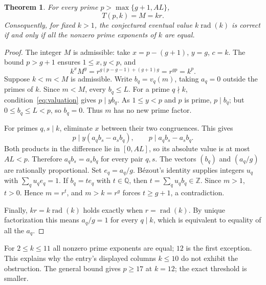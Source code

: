 \documentclass[11pt]{article}
\newtheorem{theorem}{Theorem}
\DeclareMathOperator{\rad}{rad}
\begin{document}
\begin{theorem}\label{thm:correction}
For every prime $p>\max\{g+1,AL\}$,
\[
 T(p,k)=M=k r.
\]
Consequently, for fixed $k>1$, the conjectured eventual value $k\rad(k)$
is correct if and only if all the nonzero prime exponents of $k$ are equal.
\end{theorem}
\begin{proof}
The integer $M$ is admissible: take $x=p-(g+1)$, $y=g$, $c=k$.
The bound $p>g+1$ ensures $1\le x,y<p$, and
\[
 k^x M^y=r^{g(p-g-1)+(g+1)g}=r^{gp}=k^p.
\]
Suppose $k<m<M$ is admissible. Write $b_q=v_q(m)$, taking $a_q=0$
outside the primes of $k$. Since $m<M$, every $b_q\le L$.
For a prime $q\nmid k$, condition~\eqref{eq:valuation} gives $p\mid yb_q$.
As $1\le y<p$ and $p$ is prime, $p\mid b_q$; but $0\le b_q\le L<p$,
so $b_q=0$. Thus $m$ has no new prime factor.

For primes $q,s\mid k$, eliminate $x$ between their two congruences.
This gives
\[
 p\mid y(a_q b_s-a_s b_q),\qquad
 p\mid a_q b_s-a_s b_q.
\]
Both products in the difference lie in $[0,AL]$, so its absolute value
is at most $AL<p$. Therefore $a_q b_s=a_s b_q$ for every pair $q,s$.
The vectors $(b_q)$ and $(a_q/g)$ are rationally proportional.
Set $e_q=a_q/g$. B\'ezout's identity supplies integers $u_q$ with
$\sum_q u_qe_q=1$. If $b_q=t e_q$ with $t\in\mathbb Q$, then
$t=\sum_q u_qb_q\in\mathbb Z$. Since $m>1$, $t>0$.
Hence $m=r^t$, and $m>k=r^g$ forces $t\ge g+1$, a contradiction.

Finally, $kr=k\rad(k)$ holds exactly when $r=\rad(k)$.
By unique factorization this means $a_q/g=1$ for every $q\mid k$,
which is equivalent to equality of all the $a_q$.
\end{proof}
For $2\le k\le11$ all nonzero prime exponents are equal; $12$ is the
first exception. This explains why the entry's displayed columns $k\le10$
do not exhibit the obstruction. The general bound gives $p\ge17$
at $k=12$; the exact threshold is smaller.
\end{document}
